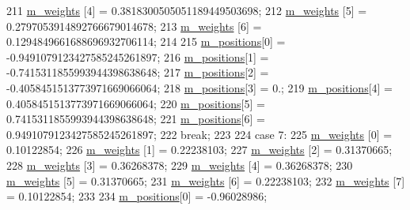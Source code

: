 \begin{DoxyCode}
211       \hyperlink{class_q_u_e_s_o_1_1_base1_d_quadrature_a7117fec020a8098d1c22b604268bad93}{m\_weights}  [4] =  0.3818300505051189449503698;
212       \hyperlink{class_q_u_e_s_o_1_1_base1_d_quadrature_a7117fec020a8098d1c22b604268bad93}{m\_weights}  [5] =  0.2797053914892766679014678;
213       \hyperlink{class_q_u_e_s_o_1_1_base1_d_quadrature_a7117fec020a8098d1c22b604268bad93}{m\_weights}  [6] =  0.1294849661688696932706114;
214 
215       \hyperlink{class_q_u_e_s_o_1_1_base1_d_quadrature_aeda387c028c3ba89ea0f9637a2234212}{m\_positions}[0] = -0.9491079123427585245261897;
216       \hyperlink{class_q_u_e_s_o_1_1_base1_d_quadrature_aeda387c028c3ba89ea0f9637a2234212}{m\_positions}[1] = -0.7415311855993944398638648;
217       \hyperlink{class_q_u_e_s_o_1_1_base1_d_quadrature_aeda387c028c3ba89ea0f9637a2234212}{m\_positions}[2] = -0.4058451513773971669066064;
218       \hyperlink{class_q_u_e_s_o_1_1_base1_d_quadrature_aeda387c028c3ba89ea0f9637a2234212}{m\_positions}[3] =  0.;
219       \hyperlink{class_q_u_e_s_o_1_1_base1_d_quadrature_aeda387c028c3ba89ea0f9637a2234212}{m\_positions}[4] =  0.4058451513773971669066064;
220       \hyperlink{class_q_u_e_s_o_1_1_base1_d_quadrature_aeda387c028c3ba89ea0f9637a2234212}{m\_positions}[5] =  0.7415311855993944398638648;
221       \hyperlink{class_q_u_e_s_o_1_1_base1_d_quadrature_aeda387c028c3ba89ea0f9637a2234212}{m\_positions}[6] =  0.9491079123427585245261897;
222     \textcolor{keywordflow}{break};
223 
224     \textcolor{keywordflow}{case} 7:
225       \hyperlink{class_q_u_e_s_o_1_1_base1_d_quadrature_a7117fec020a8098d1c22b604268bad93}{m\_weights}  [0] =  0.10122854;
226       \hyperlink{class_q_u_e_s_o_1_1_base1_d_quadrature_a7117fec020a8098d1c22b604268bad93}{m\_weights}  [1] =  0.22238103;
227       \hyperlink{class_q_u_e_s_o_1_1_base1_d_quadrature_a7117fec020a8098d1c22b604268bad93}{m\_weights}  [2] =  0.31370665;
228       \hyperlink{class_q_u_e_s_o_1_1_base1_d_quadrature_a7117fec020a8098d1c22b604268bad93}{m\_weights}  [3] =  0.36268378;
229       \hyperlink{class_q_u_e_s_o_1_1_base1_d_quadrature_a7117fec020a8098d1c22b604268bad93}{m\_weights}  [4] =  0.36268378;
230       \hyperlink{class_q_u_e_s_o_1_1_base1_d_quadrature_a7117fec020a8098d1c22b604268bad93}{m\_weights}  [5] =  0.31370665;
231       \hyperlink{class_q_u_e_s_o_1_1_base1_d_quadrature_a7117fec020a8098d1c22b604268bad93}{m\_weights}  [6] =  0.22238103;
232       \hyperlink{class_q_u_e_s_o_1_1_base1_d_quadrature_a7117fec020a8098d1c22b604268bad93}{m\_weights}  [7] =  0.10122854;
233 
234       \hyperlink{class_q_u_e_s_o_1_1_base1_d_quadrature_aeda387c028c3ba89ea0f9637a2234212}{m\_positions}[0] = -0.96028986;

\end{DoxyCode}

